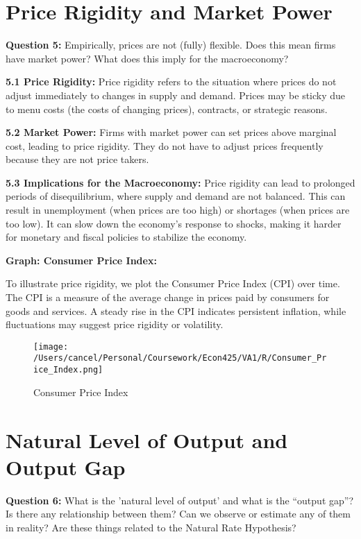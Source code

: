 \documentclass{article}
\begin{document}
\hrulefill

\section{Price Rigidity and Market Power}

\textbf{Question 5:} Empirically, prices are not (fully) flexible. Does this mean firms have market power? What does this imply for the macroeconomy?

\textbf{5.1 Price Rigidity:} Price rigidity refers to the situation where prices do not adjust immediately to changes in supply and demand. Prices may be sticky due to menu costs (the costs of changing prices), contracts, or strategic reasons.

\textbf{5.2 Market Power:} Firms with market power can set prices above marginal cost, leading to price rigidity. They do not have to adjust prices frequently because they are not price takers.

\textbf{5.3 Implications for the Macroeconomy:} Price rigidity can lead to prolonged periods of disequilibrium, where supply and demand are not balanced. This can result in unemployment (when prices are too high) or shortages (when prices are too low). It can slow down the economy’s response to shocks, making it harder for monetary and fiscal policies to stabilize the economy.

\textbf{Graph: Consumer Price Index:} 

To illustrate price rigidity, we plot the Consumer Price Index (CPI) over time. The CPI is a measure of the average change in prices paid by consumers for goods and services. A steady rise in the CPI indicates persistent inflation, while fluctuations may suggest price rigidity or volatility.

\begin{figure}[h!]
    \centering
    \texttt{[image: /Users/cancel/Personal/Coursework/Econ425/VA1/R/Consumer\_Price\_Index.png]}
    \caption{Consumer Price Index}
\end{figure}

\hrulefill

\section{Natural Level of Output and Output Gap}

\textbf{Question 6:} What is the 'natural level of output' and what is the ``output gap''? Is there any relationship between them? Can we observe or estimate any of them in reality? Are these things related to the Natural Rate Hypothesis?
\end{document}

